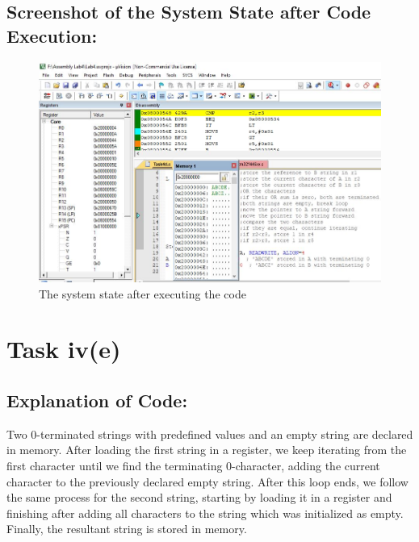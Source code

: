 \documentclass[12pt]{article}
\begin{document}
 \subsection{Screenshot of the System State after Code Execution:}
 \begin{figure}[ht]
     \centering
     \includegraphics[scale=.7]{images/aftertask4d.JPG}
     \caption{The system state after executing the code}
     \label{fig:after_task_four_d}
 \end{figure}
 \pagebreak
\section{Task iv(e)}
\subsection{Explanation of Code:}
Two 0-terminated strings with predefined values and an empty string are declared in memory. After loading the first string in a register, we keep iterating from the first character until we find the terminating 0-character, adding the current character to the previously declared empty string. After this loop ends, we follow the same process for the second string, starting by loading it in a register and finishing after adding all characters to the string which was initialized as empty. Finally, the resultant string is stored in memory.
\end{document}
